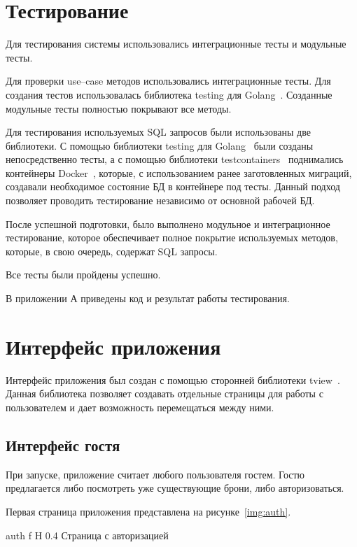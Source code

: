 \section{Тестирование}
Для тестирования системы использовались интеграционные тесты и модульные тесты.

Для проверки use--case методов использовались интеграционные тесты.
Для создания тестов использовалась библиотека testing для Golang~\cite{golang_testing}.
Созданные модульные тесты полностью покрывают все методы.

Для тестирования используемых SQL запросов были использованы две библиотеки.
С помощью библиотеки testing для Golang~\cite{golang_testing} были созданы непосредственно тесты, а с помощью библиотеки testcontainers~\cite{golang_testcontainers} поднимались контейнеры Docker~\cite{docker}, которые, с использованием ранее заготовленных миграций, создавали необходимое состояние БД в контейнере под тесты.
Данный подход позволяет проводить тестирование независимо от основной рабочей БД.

После успешной подготовки, было выполнено модульное и интеграционное тестирование, которое обеспечивает полное покрытие используемых методов, которые, в свою очередь, содержат SQL запросы.

Все тесты были пройдены успешно.

В приложении А приведены код и результат работы тестирования. 

\section{Интерфейс приложения}
Интерфейс приложения был создан с помощью сторонней библиотеки tview~\cite{golang_tview}.
Данная библиотека позволяет создавать отдельные страницы для работы с пользователем и дает возможность перемещаться между ними. 

\subsection{Интерфейс гостя}

При запуске, приложение считает любого пользователя гостем. 
Гостю предлагается либо посмотреть уже существующие брони, либо авторизоваться.

Первая страница приложения представлена на рисунке~\ref{img:auth}.




{auth} %
{f} %
{H} %
{0.4\textwidth} %
{Страница с авторизацией} %



